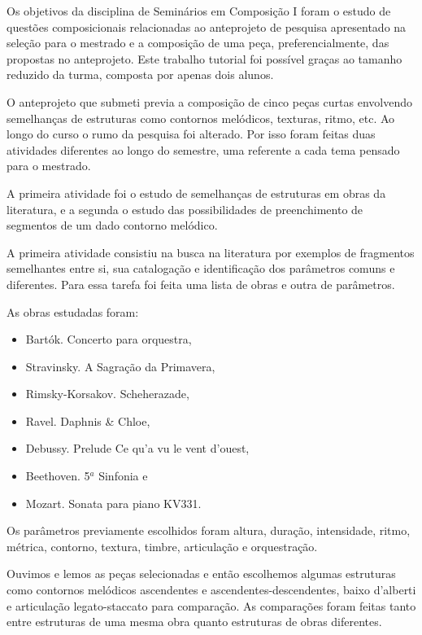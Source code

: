 \documentclass[12pt]{article}
\begin{document}



Os objetivos da disciplina de Seminários em Composição I foram o
estudo de questões composicionais relacionadas ao anteprojeto de
pesquisa apresentado na seleção para o mestrado e a composição de uma
peça, preferencialmente, das propostas no anteprojeto. Este trabalho
tutorial foi possível graças ao tamanho reduzido da turma, composta
por apenas dois alunos.

O anteprojeto que submeti previa a composição de cinco peças curtas
envolvendo semelhanças de estruturas como contornos melódicos,
texturas, ritmo, etc. Ao longo do curso o rumo da pesquisa foi
alterado. Por isso foram feitas duas atividades diferentes ao longo do
semestre, uma referente a cada tema pensado para o mestrado.

A primeira atividade foi o estudo de semelhanças de estruturas em
obras da literatura, e a segunda o estudo das possibilidades de
preenchimento de segmentos de um dado contorno melódico.

A primeira atividade consistiu na busca na literatura por exemplos de
fragmentos semelhantes entre si, sua catalogação e identificação dos
parâmetros comuns e diferentes. Para essa tarefa foi feita uma lista
de obras e outra de parâmetros.

As obras estudadas foram:
\begin{itemize}
\item Bartók. Concerto para orquestra,
\item Stravinsky. A Sagração da Primavera,
\item Rimsky-Korsakov. Scheherazade,
\item Ravel. Daphnis \& Chloe,
\item Debussy. Prelude Ce qu'a vu le vent d'ouest,
\item Beethoven. 5$^{a}$ Sinfonia e
\item Mozart. Sonata para piano KV331.
\end{itemize}

Os parâmetros previamente escolhidos foram altura, duração,
intensidade, ritmo, métrica, contorno, textura, timbre, articulação e
orquestração.

Ouvimos e lemos as peças selecionadas e então escolhemos algumas
estruturas como contornos melódicos ascendentes e
ascendentes-descendentes, baixo d'alberti e articulação
legato-staccato para comparação. As comparações foram feitas tanto
entre estruturas de uma mesma obra quanto estruturas de obras
diferentes.
\end{document}
